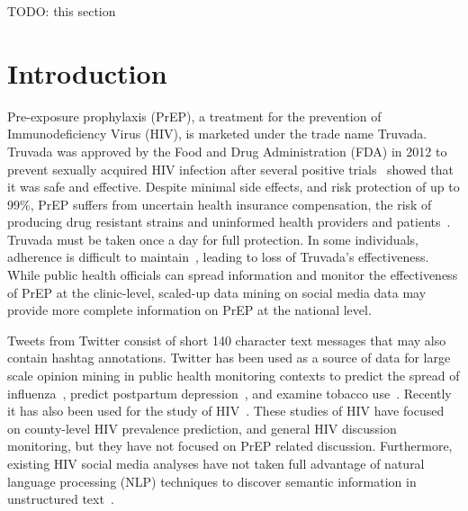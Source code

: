 \documentclass{sig-alternate-05-2015}
\begin{document}
%
%

\begin{CCSXML}
TODO: this section
\end{CCSXML}


%
%

%
%
\printccsdesc



\section{Introduction}
Pre-exposure prophylaxis (PrEP), a treatment for the prevention of Immunodeficiency Virus (HIV), is marketed under the trade name Truvada. Truvada was approved by the Food and Drug Administration (FDA) in 2012 to prevent sexually acquired HIV infection after several positive trials~\cite{grant2010preexposure,thigpen2012antiretroviral} showed that it was safe and effective. Despite minimal side effects, and risk protection of up to 99\%, PrEP suffers from uncertain health insurance compensation, the risk of producing drug resistant strains and uninformed health providers and patients~\cite{liu2014early}. Truvada must be taken once a day for full protection. In some individuals, adherence is difficult to maintain~\cite{van2012unraveling}, leading to loss of Truvada's effectiveness. While public health officials can spread information and monitor the effectiveness of PrEP at the clinic-level, scaled-up data mining on social media data may provide more complete information on PrEP at the national level.

Tweets from Twitter consist of short 140 character text messages that may also contain hashtag annotations. Twitter has been used as a source of data for large scale opinion mining in public health monitoring contexts to predict the spread of influenza~\cite{aramaki2011twitter}, predict postpartum depression~\cite{de2013predicting}, and examine tobacco use~\cite{myslin2013using}. Recently it has also been used for the study of HIV~\cite{young2014methods,young2013online}. These studies of HIV have focused on county-level HIV prevalence prediction, and general HIV discussion monitoring, but they have not focused on PrEP related discussion. Furthermore, existing HIV social media analyses have not taken full advantage of natural language processing (NLP) techniques to discover semantic information in unstructured text~\cite{young2015big}.
\end{document}
